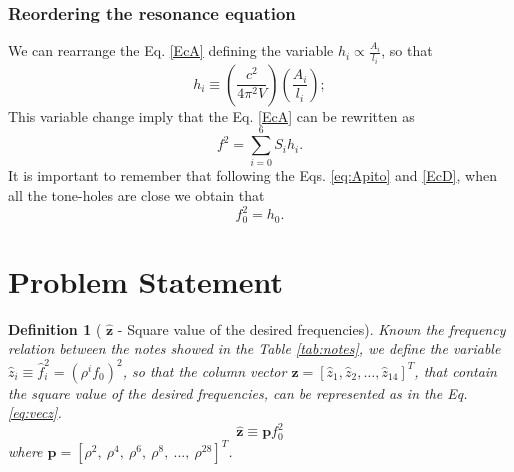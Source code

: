 \documentclass[11pt,twocolumn]{article}
\newtheorem{mydef}{Definition}[section]
\begin{document}
\subsubsection{Reordering the resonance equation}
We can rearrange the Eq. \ref{EcA} defining the variable $h_{i}\propto \frac{A_{i}}{l_{i}}$, so that
\begin{equation} \label{EcC}
 h_{i} \equiv  \left( \frac{c^2}{4 {\pi}^2 V}\right) \left( \frac{A_{i}}{l_{i}}    \right);
\end{equation}
This variable change imply that the Eq. \ref{EcA} can be rewritten as
\begin{equation} \label{EcD}
 f^{2} = \sum_{i=0}^{6}{S_i h_i}.
\end{equation}
It is important to remember that following the Eqs. \ref{eq:Apito} and \ref{EcD},
when all the tone-holes are close we obtain that 
\begin{equation} \label{EcDa}
f_0^{2} = h_0.
\end{equation}



\section{Problem Statement}


\begin{mydef}[
$\mathbf{\hat{z}}$ - Square value of the desired frequencies]
Known the frequency relation between the notes showed in the Table \ref{tab:notes}, 
we define the variable $\hat{z}_i\equiv \hat{f}_i^2 = \left( {\rho}^{i} f_0 \right)^{2} $,
so that the  column vector $\mathbf{\hat{z}}= \left[ \hat{z}_1, \hat{z}_2, \hdots, \hat{z}_{14}\right]^{T} $, 
that contain the square value of the desired frequencies, 
can be represented as in the Eq. \ref{eq:vecz}.
\begin{equation} \label{eq:vecz}
\mathbf{\hat{z}}
\equiv \mathbf{p} f_{0}^2
\end{equation}
where $\mathbf{p}=[\rho^2,~\rho^4,~\rho^6,~\rho^8,~...,~\rho^{28}]^T$.
\end{mydef}
\end{document}
